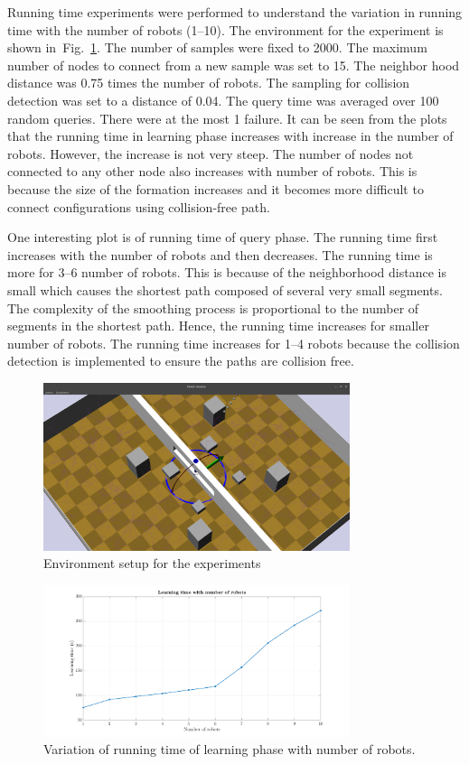 \documentclass[12pt,a4paper, onecolumn]{IEEEtran}
\newcommand{\fgref}[1]{Fig.~\ref{#1}}
\begin{document}
Running time experiments were performed to understand the variation in running time with
the number of robots (1--10). The environment for the experiment is shown in~\fgref{fig:env}. The
number of samples were fixed to 2000. The maximum number of nodes to connect  from a new
sample was set to 15. The neighbor hood distance was 0.75 times the number of robots. The
sampling for collision detection was set to a distance of 0.04. The query time was
averaged over 100 random queries. There were at the most 1 failure. It can be seen from
the plots that the running time in learning phase increases with increase in the number of robots. However,
the increase is not very steep. The number of nodes not connected to any other node also
increases with number of robots. This is because the size of the formation increases and
it becomes more difficult to connect configurations using collision-free path.

One interesting plot is of running time of query phase. The running time first increases
with the number of robots and then decreases. The running time is more for
3--6 number of robots. This is because of the neighborhood distance is small 
which causes the shortest path composed of several very small
segments. The complexity of the smoothing process is proportional to the number of
segments in the shortest path. Hence, the running time increases for smaller number of
robots. The running time increases for 1--4 robots because the collision detection is
implemented to ensure the paths are collision free.

\begin{figure}[htbp]
  \centering
  \includegraphics[width=0.8\textwidth]{env.png}
  \caption{Environment setup for the experiments}
  \label{fig:env}
\end{figure}
\begin{figure}[htbp]
  \centering
  \includegraphics[width=0.8\textwidth, trim={4cm 0 4cm 0},clip]{lT_plot.png}
  \caption{Variation of running time of learning phase with number of robots. }
  \label{fig:lT}
\end{figure}
\end{document}
